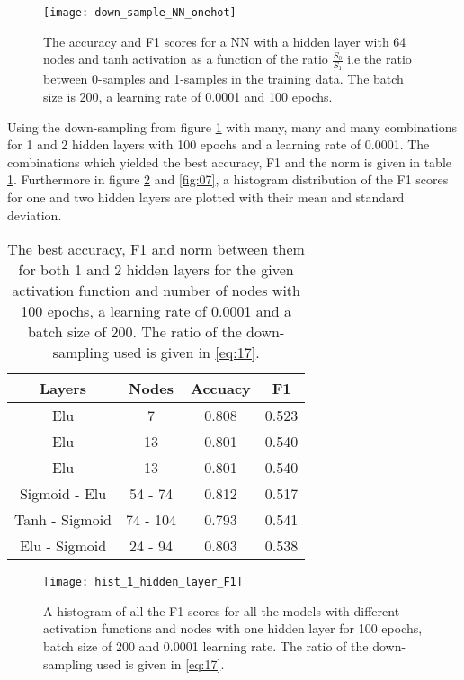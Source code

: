 \documentclass[uio,jmp,amsmath,amssymb,reprint,nofootinbib]{revtex4-1}
\numberwithin{equation}{section}
\begin{document}
\begin{figure}[H]
    \centering
    \texttt{[image: down\_sample\_NN\_onehot]}
    \caption{The accuracy and F1 scores for a NN with a hidden layer with 64 nodes and tanh activation as a function of the ratio \(\frac{S_0}{S_1}\) i.e the ratio between 0-samples and 1-samples in the training data. The batch size is 200, a learning rate of 0.0001 and 100 epochs.}
    \label{fig:05}
\end{figure}

Using the down-sampling from figure \ref{fig:05} with many, many and many combinations for 1 and 2 hidden layers with 100 epochs and a learning rate of 0.0001. The combinations which yielded the best accuracy, F1 and the norm is given in table \ref{tab:07}. Furthermore in figure \ref{fig:06} and \ref{fig:07}, a histogram distribution of the F1 scores for one and two hidden layers are plotted with their mean and standard deviation.


\begin{table}[H]
\caption{The best accuracy, F1 and norm between them for both 1 and 2 hidden layers for the given activation function and number of nodes with 100 epochs, a learning rate of 0.0001 and a batch size of 200. The ratio of the down-sampling used is given in \ref{eq:17}.}
\begin{tabular}{|c|c|c|c|}\hline
Layers & Nodes & Accuacy & F1 \\ \hline
Elu & 7 & 0.808 & 0.523\\ \hline
Elu & 13 & 0.801 & 0.540\\ \hline
Elu & 13 & 0.801 & 0.540\\ \hline
Sigmoid - Elu & 54 - 74 & 0.812 & 0.517\\ \hline
Tanh - Sigmoid & 74 - 104 & 0.793 & 0.541\\ \hline
Elu - Sigmoid & 24 - 94 & 0.803 & 0.538\\ \hline
\end{tabular}
\label{tab:07}
\end{table}

\begin{figure}[H]
    \centering
    \texttt{[image: hist\_1\_hidden\_layer\_F1]}
    \caption{A histogram of all the F1 scores for all the models with different activation functions and nodes with one hidden layer for 100 epochs, batch size of 200 and 0.0001 learning rate. The ratio of the down-sampling used is given in \ref{eq:17}.}
    \label{fig:06}
\end{figure}
\end{document}
